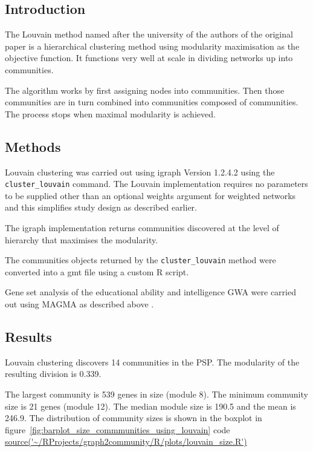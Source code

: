\subsection{Introduction}
The Louvain method named after the university of the authors of the original paper is a hierarchical clustering method using modularity maximisation as the objective function. It functions very well at scale in dividing networks up into communities.\cite{blondel2008fast}

The algorithm works by first assigning nodes into communities. Then those communities are in turn combined into communities composed of communities. The process stops when maximal modularity is achieved. 

\subsection{Methods}

Louvain clustering was carried out using igraph Version 1.2.4.2 using the \texttt{cluster\_louvain} command. The Louvain implementation requires no parameters to be supplied other than an optional weights argument for weighted networks and this simplifies study design as described earlier. 

The igraph implementation returns communities discovered at the level of hierarchy that maximises the modularity.

The communities objects returned by the \texttt{cluster\_louvain} method were converted into a gmt file using a custom R script.

Gene set analysis of the educational ability and intelligence GWA were carried out using MAGMA as described above . 



\subsection{Results}
Louvain clustering discovers 14 communities in the PSP. The modularity of the resulting division is 0.339. 

The largest community is 539 genes in size (module 8). The minimum community size is 21 genes (module 12). The median module size is 190.5 and the mean is 246.9. The distribution of community sizes is shown in the boxplot in figure~\ref{fig:barplot_size_commmunities_using_louvain} code \url{source('~/RProjects/graph2community/R/plots/louvain_size.R')}

